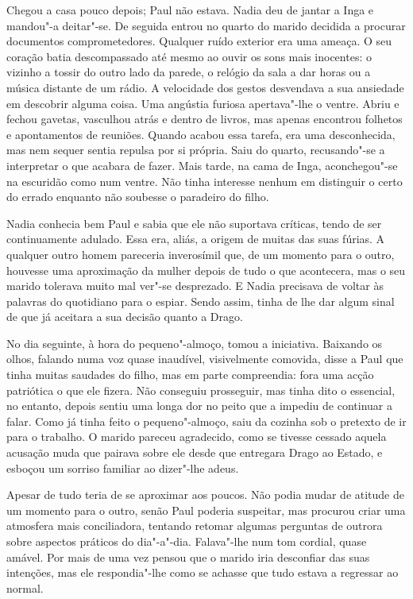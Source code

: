 Chegou a casa pouco depois; Paul não estava. Nadia deu de jantar a Inga
e mandou"-a deitar"-se. De seguida entrou no quarto do marido decidida a
procurar documentos comprometedores. Qualquer ruído exterior era uma
ameaça. O seu coração batia descompassado até mesmo ao ouvir os sons
mais inocentes: o vizinho a tossir do outro lado da parede, o relógio da
sala a dar horas ou a música distante de um rádio. A velocidade dos
gestos desvendava a sua ansiedade em descobrir alguma coisa. Uma
angústia furiosa apertava"-lhe o ventre. Abriu e fechou gavetas,
vasculhou atrás e dentro de livros, mas apenas encontrou folhetos e
apontamentos de reuniões. Quando acabou essa tarefa, era uma
desconhecida, mas nem sequer sentia repulsa por si própria. Saiu do
quarto, recusando"-se a interpretar o que acabara de fazer. Mais tarde,
na cama de Inga, aconchegou"-se na escuridão como num ventre. Não tinha
interesse nenhum em distinguir o certo do errado enquanto não soubesse o
paradeiro do filho.

\bigskip

Nadia conhecia bem Paul e sabia que ele não suportava críticas, tendo de
ser continuamente adulado. Essa era, aliás, a origem de muitas das suas
fúrias. A qualquer outro homem pareceria inverosímil que, de um momento
para o outro, houvesse uma aproximação da mulher depois de tudo o que
acontecera, mas o seu marido tolerava muito mal ver"-se desprezado. E
Nadia precisava de voltar às
palavras do quotidiano para o espiar. Sendo assim, tinha de lhe dar
algum sinal de que já aceitara a sua decisão quanto a Drago.

No dia seguinte, à hora do pequeno"-almoço, tomou a iniciativa. Baixando
os olhos, falando numa voz quase inaudível, visivelmente comovida, disse
a Paul que tinha muitas saudades do filho, mas em parte compreendia:
fora uma acção patriótica o que ele fizera. Não conseguiu prosseguir,
mas tinha dito o essencial, no entanto, depois sentiu uma longa dor no
peito que a impediu de continuar a falar. Como já tinha feito o
pequeno"-almoço, saiu da cozinha sob o pretexto de ir para o trabalho. O
marido pareceu agradecido, como se tivesse cessado aquela acusação muda
que pairava sobre ele desde que entregara Drago ao Estado, e esboçou um
sorriso familiar ao dizer"-lhe adeus.

Apesar de tudo teria de se
aproximar aos poucos. Não podia mudar de atitude de um momento para o
outro, senão Paul poderia suspeitar, mas procurou criar uma atmosfera
mais conciliadora, tentando retomar algumas perguntas de outrora sobre
aspectos práticos do dia"-a"-dia. Falava"-lhe num tom cordial, quase
amável. Por mais de uma vez pensou que o marido iria desconfiar das suas
intenções, mas ele respondia"-lhe como se achasse que tudo
estava a regressar ao normal.

